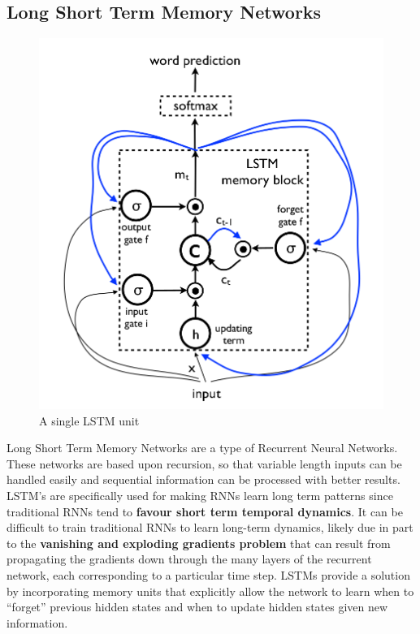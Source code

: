 \documentclass[12pt]{article}
\begin{document}
			\subsection{Long Short Term Memory Networks}
			    \begin{figure}[ht!]
			    	\centering
					\includegraphics[scale=0.266]{LSTM_unit.png}
					\caption{A single LSTM unit\label{fig6}}
				\end{figure}
				Long Short Term Memory Networks are a type of Recurrent Neural Networks. These networks are based upon recursion, so that variable length inputs can be handled easily and sequential information can be processed with better results. LSTM's are specifically used for making RNNs learn long term patterns since traditional RNNs tend to \textbf{favour short term temporal dynamics}. It can be difficult to train traditional RNNs to learn long-term dynamics, likely due in part to the \textbf{vanishing and exploding gradients problem} that can result from propagating the gradients down through the many layers of the recurrent network, each corresponding to a particular time step\cite{ltms}. LSTMs provide a solution by incorporating memory units that explicitly allow the network to learn when to ``forget'' previous hidden states and when to update hidden states given new information\cite{lstmexecute}.\\
\end{document}
